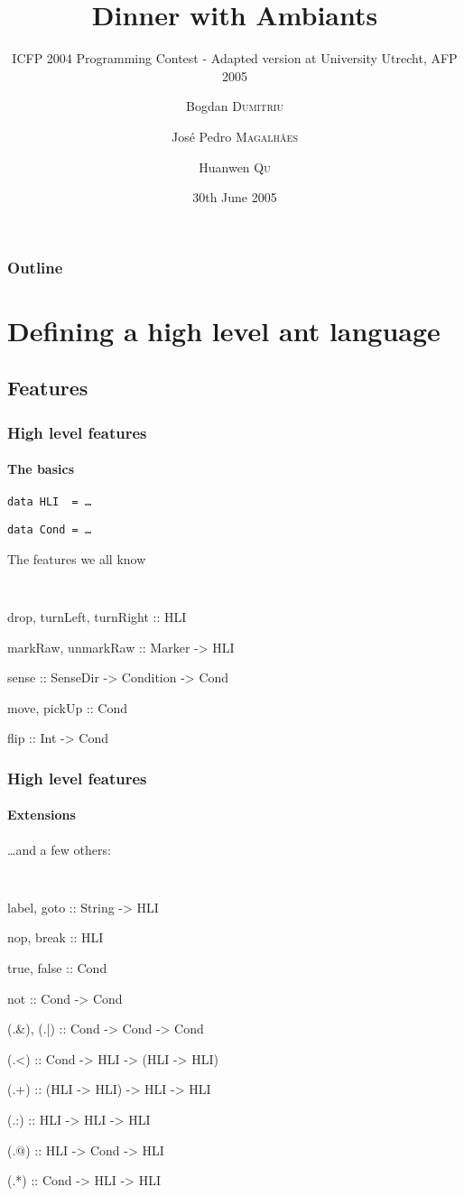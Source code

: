 \documentclass{beamer}
\title{Dinner with Ambiants}
\subtitle{ICFP 2004 Programming Contest - Adapted version at University Utrecht, AFP 2005}
\author{Bogdan \textsc{Dumitriu} \and Jos\'e Pedro \textsc{Magalh\~aes} \and Huanwen \textsc{Qu}}
\institute
{
  Department of Computer Science\\
  Utrecht University
}
\date{30th June 2005}
\begin{document}
\begin{frame}
  \titlepage
\end{frame}

\begin{frame}
  \frametitle{Outline}
  \tableofcontents%
\end{frame}

\section{Defining a high level ant language}

\subsection{Features}

\begin{frame}
  \frametitle{High level features}
  \framesubtitle{The basics}
  \texttt{data HLI \ = \ldots}
  \pause

  \texttt{data Cond = \ldots}
  \pause
  \begin{block}{The features we all know}
    \begin{itemize}
    {\tt
        \item drop, turnLeft, turnRight :: HLI
        \pause \item markRaw, unmarkRaw :: Marker -> HLI
        \pause \item sense :: SenseDir -> Condition -> Cond
        \pause \item move, pickUp :: Cond
        \pause \item flip :: Int -> Cond
    }
    \end{itemize}
  \end{block}
\end{frame}

\begin{frame}
  \frametitle{High level features}
  \framesubtitle{Extensions}

  \begin{block}{\ldots and a few others:}
    \begin{itemize}
    {\tt \small
        \item label, goto :: String -> HLI
        \pause \item nop, break :: HLI
        \pause \item true, false :: Cond
        \pause \item not :: Cond -> Cond
        \pause \item (.\&), (.|) :: Cond -> Cond -> Cond
        \pause \item (.<) :: Cond -> HLI -> (HLI -> HLI)
        \pause \item (.+) :: (HLI -> HLI) -> HLI -> HLI
        \pause \item (.:) :: HLI -> HLI -> HLI
        \pause \item (.@) :: HLI -> Cond -> HLI
        \pause \item (.*) :: Cond -> HLI -> HLI
    }
    \end{itemize}
  \end{block}
\end{frame}
\end{document}
